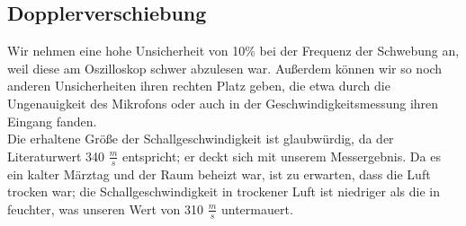 \documentclass{article}
\begin{document}
\subsection*{Dopplerverschiebung}
Wir nehmen eine hohe Unsicherheit von 10\% bei der Frequenz der Schwebung an, weil diese am Oszilloskop schwer abzulesen war. Außerdem können wir so noch anderen Unsicherheiten ihren rechten Platz geben, die etwa durch die Ungenauigkeit des Mikrofons oder auch in der Geschwindigkeitsmessung ihren Eingang fanden. \\
Die erhaltene Größe der Schallgeschwindigkeit ist glaubwürdig, da der Literaturwert 340 $\frac{m}{s}$ entspricht; er deckt sich mit unserem Messergebnis. Da es ein kalter Märztag und der Raum beheizt war, ist zu erwarten, dass die Luft trocken war; die Schallgeschwindigkeit in trockener Luft ist niedriger als die in feuchter, was unseren Wert von 310 $\frac{m}{s}$ untermauert.\\


\end{document}

